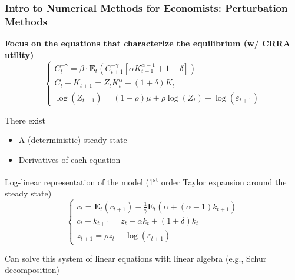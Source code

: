 \documentclass[10pt, aspectratio=1610, handout]{beamer}
\newcommand{\E}{\mathbf{E}}
\begin{document}
  \begin{frame}
    \frametitle{Intro to Numerical Methods for Economists: Perturbation Methods}

    \textbf{Focus on the equations that characterize the equilibrium (w/ CRRA utility)}
    \begin{equation*}
      \begin{cases}
        C_t^{-\gamma} = \beta \cdot \E_t \left( C_{t+1}^{-\gamma} \left[ \alpha K_{t+1}^{\alpha-1} + 1 - \delta \right] \right) \\
        C_t + K_{t+1} = Z_t K_t^\alpha + (1 + \delta) K_t  \\
        \log(Z_{t+1}) = (1-\rho) \mu + \rho \log(Z_t) + \log(\varepsilon_{t+1})
      \end{cases}
    \end{equation*}

    \vfill\pause

    There exist
    \begin{itemize}
      \item A (deterministic) steady state
      \item Derivatives of each equation
    \end{itemize}

    \vfill\pause

    Log-linear representation of the model (1\textsuperscript{st} order Taylor expansion around the steady state)
    \begin{equation*}
      \begin{cases}
        c_t = \E_t ( c_{t+1} ) - \frac{1}{\gamma} \E_t \left( \alpha + (\alpha-1) k_{t+1} \right) \\
        c_t + k_{t+1} = z_t + \alpha k_t + (1+\delta) k_t \\
        z_{t+1} = \rho z_t + \log(\varepsilon_{t+1})
      \end{cases}
    \end{equation*}

    \vfill\pause

    Can solve this system of linear equations with linear algebra (e.g., Schur decomposition)

  \end{frame}
\end{document}
